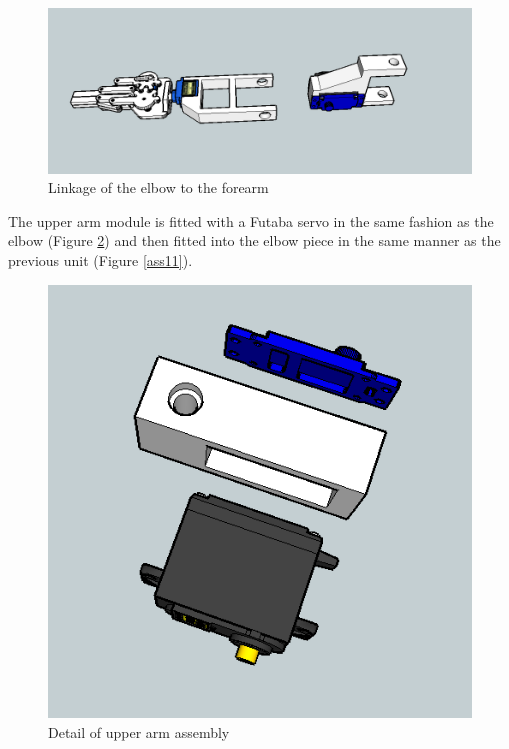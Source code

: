 	\begin{figure}[H]
			\centering
			\includegraphics[scale=0.5]{images/Assembly/7.png}
			\caption{Linkage of the elbow to the forearm }
			\label{ass7}
	\end{figure}
	\bigskip







The upper arm module is fitted with a Futaba servo in the same fashion as the elbow (Figure \ref{ass9}) and then fitted into the elbow piece in the same manner as the previous unit (Figure \ref{ass11}).\\

	\begin{figure}[H]
			\centering
			\includegraphics[scale=0.5]{images/Assembly/9.png}
			\caption{Detail of upper arm assembly }
			\label{ass9}
	\end{figure}
	\bigskip





